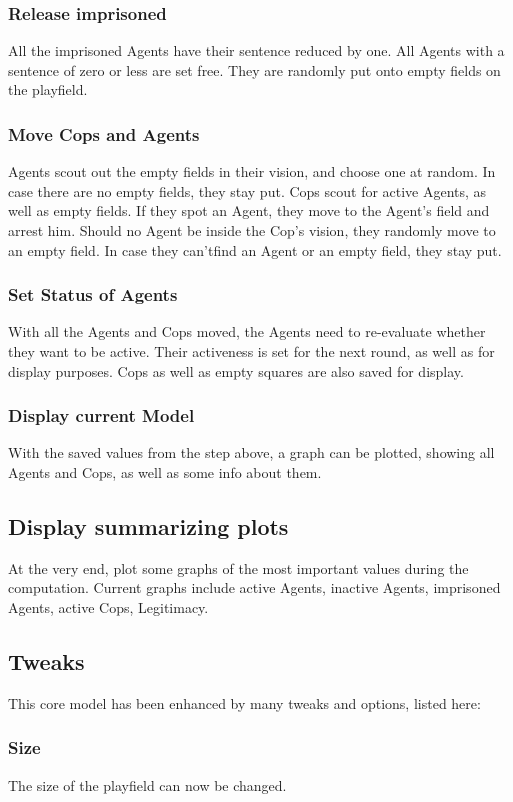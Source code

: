 \documentclass[11pt]{article}
\begin{document}
\subsubsection{Release imprisoned}
All the imprisoned Agents have their sentence reduced by one. All Agents with a sentence of zero or less are set free. They are randomly put onto empty fields on the playfield.
\subsubsection{Move Cops and Agents}
Agents scout out the empty fields in their vision, and choose one at random. In case there are no empty fields, they stay put.\newline
Cops scout for active Agents, as well as empty fields. If they spot an Agent, they move to the Agent's field and arrest him. Should no Agent be inside the Cop's vision, they randomly move to an empty field. In case they can'tfind an Agent or an empty field, they stay put.
\subsubsection{Set Status of Agents}
With all the Agents and Cops moved, the Agents need to re-evaluate whether they want to be active. Their activeness is set for the next round, as well as for display purposes. Cops as well as empty squares are also saved for display.
\subsubsection{Display current Model}
With the saved values from the step above, a graph can be plotted, showing all Agents and Cops, as well as some info about them.
\subsection{Display summarizing plots}
At the very end, plot some graphs of the most important values during the computation. Current graphs include active Agents, inactive Agents, imprisoned Agents, active Cops, Legitimacy.

\subsection{Tweaks}
This core model has been enhanced by many tweaks and options, listed here:
\subsubsection{Size}
The size of the playfield can now be changed.
\end{document}
